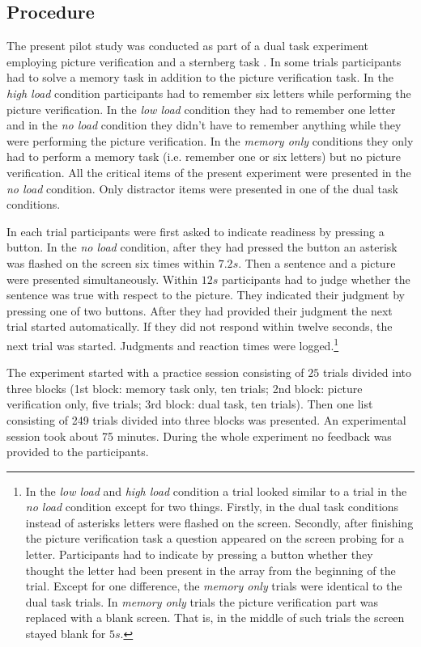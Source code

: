 \documentclass[fleqn,reqno,10pt,draft]{article}
\begin{document}
\subsection{Procedure}
The present pilot study was conducted as part of a dual task experiment employing picture verification and a sternberg task \cite{Sternberg1966}.  In some trials participants had to solve a memory task in addition to the picture verification task. In the {\it high load} condition participants had to remember six letters while performing the picture verification. In the {\it low load} condition they had to remember one letter and in the {\it no load} condition they didn't have to remember anything while they were performing the picture verification. In the {\it memory only} conditions they only had to perform a memory task (i.e. remember one or six letters) but no picture verification. All the critical items of the present experiment were presented in the {\it no load} condition. Only distractor items were presented in one of the dual task conditions.  

In each trial participants were first asked to indicate readiness by pressing a button. In the {\it no load} condition, after they had pressed the button an  asterisk was flashed on the screen six times within $7.2s$. Then a sentence and a picture were presented simultaneously. Within $12s$ participants had to judge whether the sentence was true with respect to the picture. They indicated their judgment by pressing one of two buttons. After they had provided their judgment the next trial started automatically. If they did not respond within twelve seconds, the next trial was started. Judgments and reaction times were logged.\footnote{In the {\it low load} and {\it high load} condition a trial looked similar to a trial in the {\it no load} condition except for two things. Firstly, in the dual task conditions instead of asterisks letters were flashed on the screen. Secondly, after finishing the picture verification task a question appeared on the screen probing for a letter. Participants had to indicate by pressing a button whether they thought the letter had been present in the array from the beginning of the trial. Except for one difference, the {\it memory only} trials were identical to the dual task trials. In {\it memory only} trials the picture verification part was replaced with a blank screen. That is, in the middle of such trials the screen stayed blank for $5s$. }

The experiment started with a practice session consisting of $25$ trials divided into three blocks (1st block: memory task only, ten trials; 2nd block: picture verification only, five trials; 3rd block: dual task, ten trials). Then one list consisting of 249 trials divided into three blocks was presented. An experimental session took about 75 minutes. During the whole experiment no feedback was provided to the participants.
\end{document}
